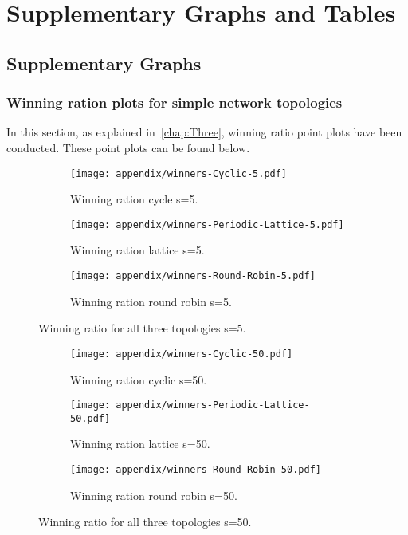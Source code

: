 \chapter{Supplementary Graphs and Tables}
\section{Supplementary Graphs}

\subsection{Winning ration plots for simple network topologies}
\label{append:wining-ratio-further-plot}
In this section, as explained in~\ref{chap:Three}, winning ratio point plots
have been conducted. These point plots can be found below.
\begin{figure}[H]
\centering
    \begin{subfigure}[t]{1\textwidth}
    \centering
        \texttt{[image: appendix/winners-Cyclic-5.pdf]}
    \caption{Winning ration cycle s=5.}
    \end{subfigure}
\hfill
    \begin{subfigure}[t]{1\textwidth}\centering
    \centering
        \texttt{[image: appendix/winners-Periodic-Lattice-5.pdf]}
    \caption{Winning ration lattice s=5.}
    \end{subfigure}
\hfill
    \begin{subfigure}[t]{1\textwidth}\centering
    \centering
        \texttt{[image: appendix/winners-Round-Robin-5.pdf]}
    \caption{Winning ration round robin s=5.}
    \end{subfigure}
\caption{Winning ratio for all three topologies s=5.}
\label{fig:winning-five}

\end{figure}

\begin{figure}[H]
\centering
    \begin{subfigure}[t]{1\textwidth}
    \centering
        \texttt{[image: appendix/winners-Cyclic-50.pdf]}
    \caption{Winning ration cyclic s=50.}
    \end{subfigure}
\hfill
    \begin{subfigure}[t]{1\textwidth}\centering
    \centering
        \texttt{[image: appendix/winners-Periodic-Lattice-50.pdf]}
    \caption{Winning ration lattice s=50.}
    \end{subfigure}
\hfill
    \begin{subfigure}[t]{1\textwidth}\centering
    \centering
        \texttt{[image: appendix/winners-Round-Robin-50.pdf]}
    \caption{Winning ration round robin s=50.}
    \end{subfigure}
\caption{Winning ratio for all three topologies s=50.}
\label{fig:winning-fifty}
\end{figure}

